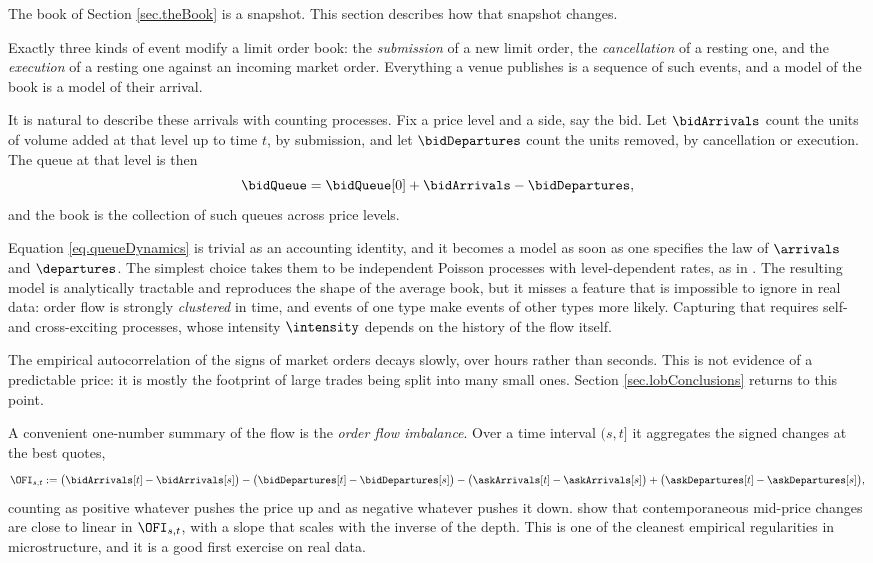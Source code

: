 The book of Section \ref{sec.theBook} is a snapshot.
This section describes how that snapshot changes.

Exactly three kinds of event modify a limit order book:
the \emph{submission} of a new limit order,
the \emph{cancellation} of a resting one,
and the \emph{execution} of a resting one against an incoming market order.
Everything a venue publishes is a sequence of such events,
and a model of the book is a model of their arrival.

It is natural to describe these arrivals with counting processes.
Fix a price level and a side, say the bid.
Let $\bidArrivals$ count the units of volume added at that level up to time $t$,
by submission,
and let $\bidDepartures$ count the units removed,
by cancellation or execution.
The queue at that level is then
\begin{equation}
\label{eq.queueDynamics}
\bidQueue = \bidQueue[0] + \bidArrivals - \bidDepartures,
\end{equation}
and the book is the collection of such queues across price levels.

Equation \eqref{eq.queueDynamics} is trivial as an accounting identity,
and it becomes a model as soon as one specifies the law of $\arrivals$ and $\departures$.
The simplest choice takes them to be independent Poisson processes with level-dependent
rates,
as in \cite{CST10sto}.
The resulting model is analytically tractable and reproduces the shape of the average book,
but it misses a feature that is impossible to ignore in real data:
order flow is strongly \emph{clustered} in time,
and events of one type make events of other types more likely.
Capturing that requires self- and cross-exciting processes,
whose intensity $\intensity$ depends on the history of the flow itself.

\begin{remark}
\label{remark.eventsAreNotIndependent}
The empirical autocorrelation of the signs of market orders
decays slowly, over hours rather than seconds.
This is not evidence of a predictable price:
it is mostly the footprint of large trades being split into many small ones.
Section \ref{sec.lobConclusions} returns to this point.
\end{remark}

A convenient one-number summary of the flow is the \emph{order flow imbalance}.
Over a time interval $(s,t]$ it aggregates the signed changes at the best quotes,
\begin{equation}
\label{eq.orderFlowImbalance}
\OFI_{s,t} :=
\big(\bidArrivals[t] - \bidArrivals[s]\big)
- \big(\bidDepartures[t] - \bidDepartures[s]\big)
- \big(\askArrivals[t] - \askArrivals[s]\big)
+ \big(\askDepartures[t] - \askDepartures[s]\big),
\end{equation}
counting as positive whatever pushes the price up and as negative whatever pushes it down.
\cite{CKS14pri} show that contemporaneous mid-price changes are close to linear in
$\OFI_{s,t}$,
with a slope that scales with the inverse of the depth.
This is one of the cleanest empirical regularities in microstructure,
and it is a good first exercise on real data.

